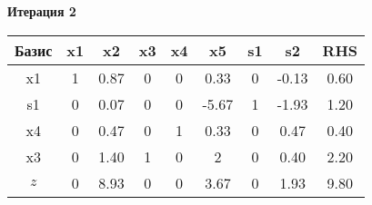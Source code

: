 \documentclass[a4paper,12pt]{article}
\begin{document}
 \textbf{Итерация 2}\\
\begin{tabular}{|c|c|c|c|c|c|c|c|c|}
\hline
Базис & x1 & x2 & x3 & x4 & x5 & s1 & s2 & RHS \\ \hline
x1 & 1 & 0.87 & 0 & 0 & 0.33 & 0 & -0.13 & 0.60 \\ \hline
s1 & 0 & 0.07 & 0 & 0 & -5.67 & 1 & -1.93 & 1.20 \\ \hline
x4 & 0 & 0.47 & 0 & 1 & 0.33 & 0 & 0.47 & 0.40 \\ \hline
x3 & 0 & 1.40 & 1 & 0 & 2 & 0 & 0.40 & 2.20 \\ \hline
$z$ & 0 & 8.93 & 0 & 0 & 3.67 & 0 & 1.93 & 9.80 \\ \hline
\end{tabular}
\vspace{5mm}
\end{document}
